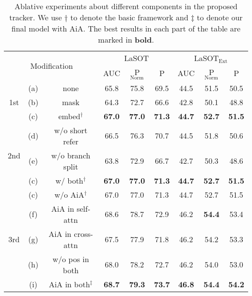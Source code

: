 \begin{table}[t]
\centering
\begin{tabular}{ccc|ccc|ccc}
\hline
\multicolumn{3}{c|}{\multirow{2}{*}{Modification}}
& \multicolumn{3}{c|}{LaSOT \cite{fan2019lasot}}
& \multicolumn{3}{c}{LaSOT$_{\text{Ext}}$ \cite{fan2021lasot}} \\
& & & AUC & P$_{\text{Norm}}$ & \multicolumn{1}{c|}{P}
& AUC & P$_{\text{Norm}}$ & P \\
\hline
\multicolumn{1}{c|}{\multirow{3}{*}{1st}} & (a) & none & 
65.8 & 75.8 & 69.5 & 44.5 & 51.5 & 50.5 \\
\multicolumn{1}{c|}{} & (b) & mask & 
64.3 & 72.7 & 66.6 & 42.8 & 50.1 & 48.8 \\
\multicolumn{1}{c|}{} & (c) & embed$^\dagger$ & 
\textbf{67.0} & \textbf{77.0} & \textbf{71.3} & \textbf{44.7} & \textbf{52.7} & \textbf{51.5} \\
\hline
\multicolumn{1}{c|}{\multirow{3}{*}{2nd}} & (d) & w/o short refer & 
66.5 & 76.3 & 70.7 & 44.5 & 51.8 & 50.6 \\
\multicolumn{1}{c|}{} & (e) & w/o branch split & 
63.8 & 72.9 & 66.7 & 42.7 & 50.3 & 48.6 \\
\multicolumn{1}{c|}{} & (c) & w/ both$^\dagger$ & 
\textbf{67.0} & \textbf{77.0} & \textbf{71.3} & \textbf{44.7} & \textbf{52.7} & \textbf{51.5} \\
\hline
\multicolumn{1}{c|}{\multirow{6}{*}{3rd}} & (c) & w/o AiA$^\dagger$ & 
67.0 & 77.0 & 71.3 & 44.7 & 52.7 & 51.5 \\
\multicolumn{1}{c|}{} & (f) & AiA in self-attn & 
68.6 & 78.7 & 72.9 & 46.2 & \textbf{54.4} & 53.4 \\
\multicolumn{1}{c|}{} & (g) & AiA in cross-attn & 
67.5 & 77.9 & 71.8 & 46.2 & 54.2 & 53.3 \\
\multicolumn{1}{c|}{} & (h) & w/o pos in both & 
68.0 & 78.2 & 72.7 & 46.2 & 54.0 & 53.0 \\
\multicolumn{1}{c|}{} & (i) & AiA in both$^\ddagger$ & 
\textbf{68.7} & \textbf{79.3} & \textbf{73.7} & \textbf{46.8} & \textbf{54.4} & \textbf{54.2} \\
\hline
\end{tabular}
\caption{Ablative experiments about different components in the proposed tracker. We use $\dagger$ to denote the basic framework and $\ddagger$ to denote our final model with AiA. The best results in each part of the table are marked in \textbf{bold}.}
\label{table-ablation}
\end{table}

